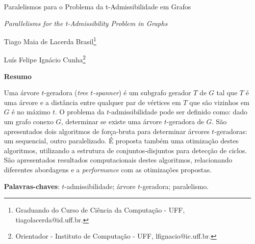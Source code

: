 \documentclass[article,a4paper,12pt,brazil,sumario=tradicional]{abntex2}
\theoremstyle{definition} %
\renewcommand{\imprimircapa}{%
\begin{capa}%
 \center
  \ABNTEXchapterfont\large\imprimirinstituicao
   \vfill
    \ABNTEXchapterfont\large\imprimirautor
    \vfill
    \begin{center}
    \ABNTEXchapterfont\bfseries\LARGE\imprimirtitulo
    \vfill
    \end{center}
    
    \large\imprimirlocal
    
    \large\imprimirdata
\end{capa}
}
\begin{document}

\imprimirfolhaderosto*

%



\pagebreak

\textual

\begin{center}
\Large Paralelismos para o Problema da t-Admissibilidade em Grafos

\textit{Parallelisms for the t-Admissibility Problem in Graphs}
\end{center}
\vspace{.2cm}

\begin{flushright}
Tiago Maia de Lacerda Brasil\footnote{Graduando do Curso de Ciência da Computação - UFF, tiagolacerda@id.uff.br.}

Luís Felipe Ignácio Cunha\footnote{Orientador - Instituto de Computação - UFF, lfignacio@ic.uff.br.}
\end{flushright}

\vspace{\onelineskip}

\begin{center}
    \textbf{Resumo}
\end{center}

\vspace{-.3cm}

\noindent Uma árvore $t$-geradora (\textit{tree $t$-spanner}) é um subgrafo gerador $T$ de $G$ tal que $T$ é uma árvore e a distância entre qualquer par de vértices em $T$ que são vizinhos em $G$ é no máximo $t$. O problema da $t$-admissibilidade pode ser definido como: dado um grafo conexo $G$, determinar se existe uma árvore $t$-geradora de $G$. São apresentados dois algoritmos de força-bruta para determinar árvores $t$-geradoras: um sequencial, outro paralelizado. É proposta também uma otimização destes algoritmos, utilizando a estrutura de conjuntos-disjuntos para detecção de ciclos. São apresentados resultados computacionais destes algoritmos, relacionando diferentes abordagens e a \textit{performance} com as otimizações propostas.

\vspace{.4cm}

\noindent
\textbf{Palavras-chaves}: $t$-admissibilidade; árvore $t$-geradora; paralelismo.

\vspace{\onelineskip}
\end{document}
